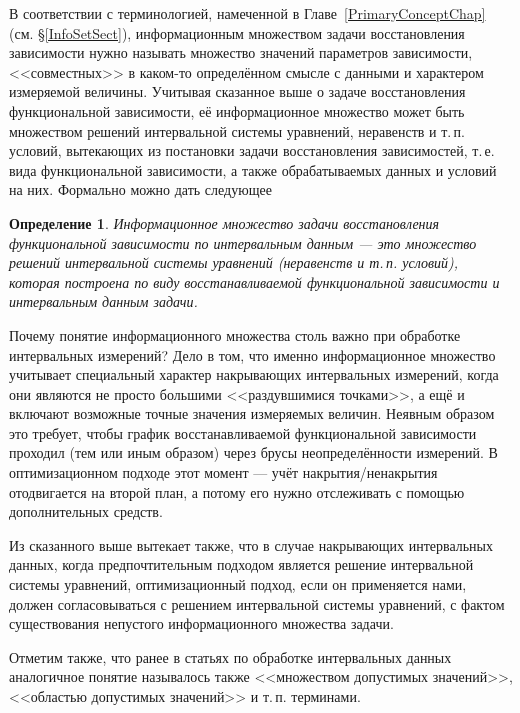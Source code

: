 \documentclass[a5paper,openany]{book}
\newtheorem{definition}{Определение}[section]
\begin{document}
В соответствии с терминологией, намеченной в Главе~\ref{PrimaryConceptChap} (см. 
\S\ref{InfoSetSect}), информационным множеством задачи восстановления зависимости 
нужно называть множество значений параметров зависимости, <<совместных>> в каком-то 
определённом смысле с данными и характером измеряемой величины. Учитывая сказанное 
выше о задаче восстановления функциональной зависимости, её информационное множество 
может быть множеством решений интервальной системы уравнений, неравенств и т.\,п. 
условий, вытекающих из постановки задачи восстановления зависимостей, т.\,е. вида 
функциональной зависимости, а также обрабатываемых данных и условий на них. 
Формально можно дать следующее 
  
\begin{definition} 
\textsl{Информационное множество} задачи восстановления функциональной зависимости 
по интервальным данным --- это множество решений интервальной системы уравнений 
(неравенств и т.\,п. условий), которая построена по виду восстанавливаемой 
функциональной зависимости и интервальным данным задачи.   
\end{definition} 
  
Почему понятие информационного множества столь важно при обработке интервальных 
измерений?  Дело в том, что именно информационное множество учитывает специальный 
характер накрывающих интервальных измерений, когда они являются не просто большими 
<<раздувшимися точками>>, а ещё и включают возможные точные значения измеряемых 
величин. Неявным образом это требует, чтобы график восстанавливаемой функциональной 
зависимости проходил (тем или иным образом) через брусы неопределённости измерений. 
В оптимизационном подходе этот момент --- учёт накрытия/ненакрытия отодвигается 
на второй план, а потому его нужно отслеживать с помощью дополнительных средств. 
  
Из сказанного выше вытекает также, что в случае накрывающих интервальных данных,  
когда предпочтительным подходом является решение интервальной системы уравнений, 
оптимизационный подход, если он применяется нами, должен согласовываться 
с решением интервальной системы уравнений, с фактом существования непустого 
информационного множества задачи. 
  
Отметим также, что ранее в статьях по обработке интервальных данных аналогичное 
понятие называлось также <<множеством допустимых значений>>, <<областью допустимых 
значений>> и т.\,п. терминами. 
  
  
\end{document}
